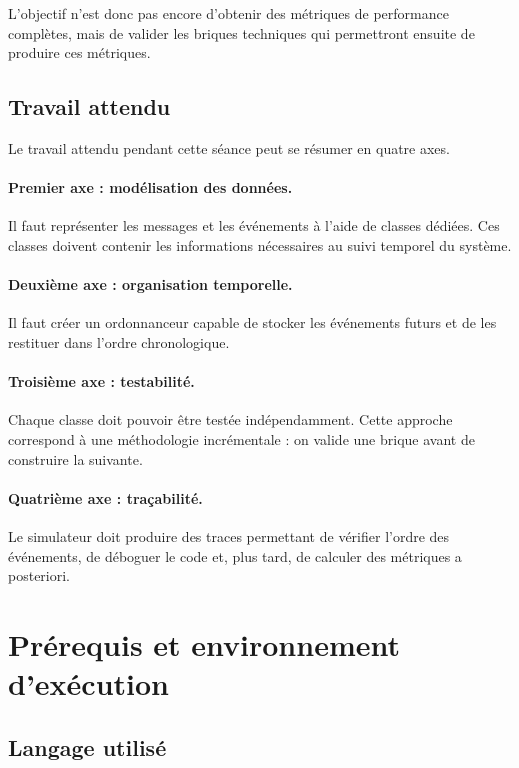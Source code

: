 \documentclass{article}
\begin{document}
L’objectif n’est donc pas encore d’obtenir des métriques de performance complètes, mais de valider les briques techniques qui permettront ensuite de produire ces métriques.

\subsection{Travail attendu}

Le travail attendu pendant cette séance peut se résumer en quatre axes.

\paragraph{Premier axe : modélisation des données.}
Il faut représenter les messages et les événements à l’aide de classes dédiées. Ces classes doivent contenir les informations nécessaires au suivi temporel du système.

\paragraph{Deuxième axe : organisation temporelle.}
Il faut créer un ordonnanceur capable de stocker les événements futurs et de les restituer dans l’ordre chronologique.

\paragraph{Troisième axe : testabilité.}
Chaque classe doit pouvoir être testée indépendamment. Cette approche correspond à une méthodologie incrémentale : on valide une brique avant de construire la suivante.

\paragraph{Quatrième axe : traçabilité.}
Le simulateur doit produire des traces permettant de vérifier l’ordre des événements, de déboguer le code et, plus tard, de calculer des métriques a posteriori.

\section{Prérequis et environnement d’exécution}
\subsection{Langage utilisé}
\end{document}
